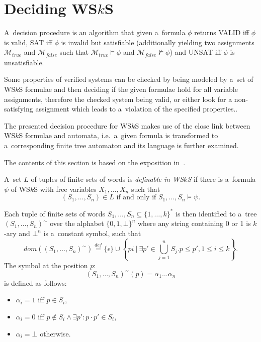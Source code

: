 \section{Deciding WS$k$S}\label{classical}

A~decision procedure is an algorithm that given a~formula $\phi$ returns VALID
iff $\phi$ is valid, SAT iff $\phi$ is invalid but satisfiable (additionally
yielding two assignments $\mathcal{M}_{true}$ and $\mathcal{M}_{false}$ such
that $\mathcal{M}_{\mathit{true}} \models \phi$ and
$\mathcal{M}_{\mathit{false}} \not\models \phi$) and UNSAT iff $\phi$ is
unsatisfiable.

Some properties of verified systems can be checked by being modeled by a~set of
WS$k$S formulae and then deciding if the given formulae hold for all variable
assignments, therefore the checked system being valid, or either look for a
non-satisfying assignment which leads to a~violation of the specified
properties..

The presented decision procedure for WS$k$S makes use of the close link between
WS$k$S formulae and automata, i.e.\ a~given formula is transformed to
a~corresponding finite tree automaton and its language is further examined. 

The contents of this section is based on the exposition in~\cite{tata}.

\begin{defz}
 A~set $L$ of tuples of finite sets of words is \emph{definable in WS$k$S} if
 there is a~formula $\psi$ of WS$k$S with free variables $X_1,\ldots,X_n$ such
 that \begin{equation}(S_1,\ldots,S_n) \in L \text{ if and only if }
 S_1,\ldots,S_n \models \psi.\end{equation}
\end{defz} Each tuple of finite sets of words $S_1,\ldots,S_n \subseteq
\{1,\ldots,k\}^*$ is then identified to a~tree $(S_1,\ldots,S_n)^\sim$ over the
alphabet $\{0,1,\bot\}^n$ where any string containing 0 or 1 is $k$-ary and
$\bot^n$ is a~constant symbol, such that
 \begin{equation}
  dom((S_1,\ldots,S_n)^\sim) \overset{\mathit{def}}{=} \{\epsilon\} \cup \left\{
  pi\ \Bigg|\ \exists p' \in \bigcup_{j = 1}^n S_j.p \leq p', 1 \leq i \leq
  k\right\}.
 \end{equation}
The symbol at the position $p$: \begin{equation}(S_1,\ldots,S_n)^\sim(p) =
\alpha_1\ldots\alpha_n\end{equation} is defined as follows:
 \begin{itemize}
  \item $\alpha_i = 1 \text{ iff } p \in S_i$,
  \item $\alpha_i = 0 \text{ iff } p \notin S_i \wedge \exists p': p\cdot p' \in S_i$,
  \item $\alpha_i = \bot$ otherwise.
 \end{itemize}
 
